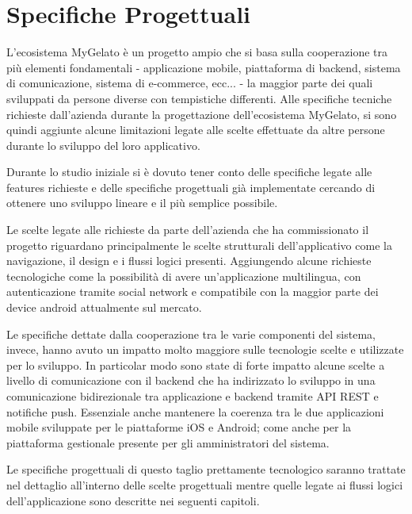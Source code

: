 \section{Specifiche Progettuali}
L'ecosistema MyGelato è un progetto ampio che si basa sulla cooperazione tra più elementi fondamentali - applicazione mobile, piattaforma di backend, sistema di comunicazione, sistema di e-commerce, ecc... - la maggior parte dei quali sviluppati da persone diverse con tempistiche differenti.
Alle specifiche tecniche richieste dall'azienda durante la progettazione dell'ecosistema MyGelato, si sono quindi aggiunte alcune limitazioni legate alle scelte effettuate da altre persone durante lo sviluppo del loro applicativo.

Durante lo studio iniziale si è dovuto tener conto delle specifiche legate alle features richieste e delle specifiche progettuali già implementate cercando di ottenere uno sviluppo lineare e il più semplice possibile.

Le scelte legate alle richieste da parte dell'azienda che ha commissionato il progetto riguardano principalmente le scelte strutturali dell'applicativo come la navigazione, il design e i flussi logici presenti.
Aggiungendo alcune richieste tecnologiche come la possibilità di avere un'applicazione multilingua, con autenticazione tramite social network e compatibile con la maggior parte dei device android attualmente sul mercato.

Le specifiche dettate dalla cooperazione tra le varie componenti del sistema, invece, hanno avuto un impatto molto maggiore sulle tecnologie scelte e utilizzate per lo sviluppo.
In particolar modo sono state di forte impatto alcune scelte a livello di comunicazione con il backend che ha indirizzato lo sviluppo in una comunicazione bidirezionale tra applicazione e backend tramite API REST e notifiche push.
Essenziale anche mantenere la coerenza tra le due applicazioni mobile sviluppate per le piattaforme iOS e Android; come anche per la piattaforma gestionale presente per gli amministratori del sistema.

Le specifiche progettuali di questo taglio prettamente tecnologico saranno trattate nel dettaglio all'interno delle scelte progettuali mentre quelle legate ai flussi logici dell'applicazione sono descritte nei seguenti capitoli.

